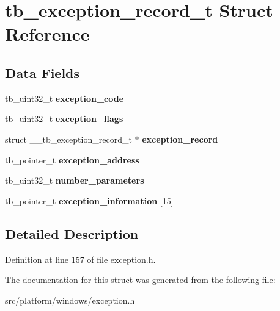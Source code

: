 \hypertarget{structtb__exception__record__t}{\section{tb\-\_\-exception\-\_\-record\-\_\-t Struct Reference}
\label{structtb__exception__record__t}
}
\subsection*{Data Fields}
\begin{DoxyCompactItemize}
\item 
\hypertarget{structtb__exception__record__t_a7e5b06b69ad5821eeed825578dd5a037}{tb\-\_\-uint32\-\_\-t {\bfseries exception\-\_\-code}}\label{structtb__exception__record__t_a7e5b06b69ad5821eeed825578dd5a037}

\item 
\hypertarget{structtb__exception__record__t_a90b651d3bb23bbf3cbd69ca369b53c33}{tb\-\_\-uint32\-\_\-t {\bfseries exception\-\_\-flags}}\label{structtb__exception__record__t_a90b651d3bb23bbf3cbd69ca369b53c33}

\item 
\hypertarget{structtb__exception__record__t_ad8315e00101725d30342afa262aab4b4}{struct \-\_\-\-\_\-tb\-\_\-exception\-\_\-record\-\_\-t $\ast$ {\bfseries exception\-\_\-record}}\label{structtb__exception__record__t_ad8315e00101725d30342afa262aab4b4}

\item 
\hypertarget{structtb__exception__record__t_afc1fde04304da133a23dbbf1b57ffb24}{tb\-\_\-pointer\-\_\-t {\bfseries exception\-\_\-address}}\label{structtb__exception__record__t_afc1fde04304da133a23dbbf1b57ffb24}

\item 
\hypertarget{structtb__exception__record__t_add8725ae7dd75b3c2a15cbeb6a2281e1}{tb\-\_\-uint32\-\_\-t {\bfseries number\-\_\-parameters}}\label{structtb__exception__record__t_add8725ae7dd75b3c2a15cbeb6a2281e1}

\item 
\hypertarget{structtb__exception__record__t_a2bbc8b3f77c15248beca47227b01feb7}{tb\-\_\-pointer\-\_\-t {\bfseries exception\-\_\-information} \mbox{[}15\mbox{]}}\label{structtb__exception__record__t_a2bbc8b3f77c15248beca47227b01feb7}

\end{DoxyCompactItemize}


\subsection{Detailed Description}


Definition at line 157 of file exception.\-h.



The documentation for this struct was generated from the following file\-:\begin{DoxyCompactItemize}
\item 
src/platform/windows/exception.\-h\end{DoxyCompactItemize}
